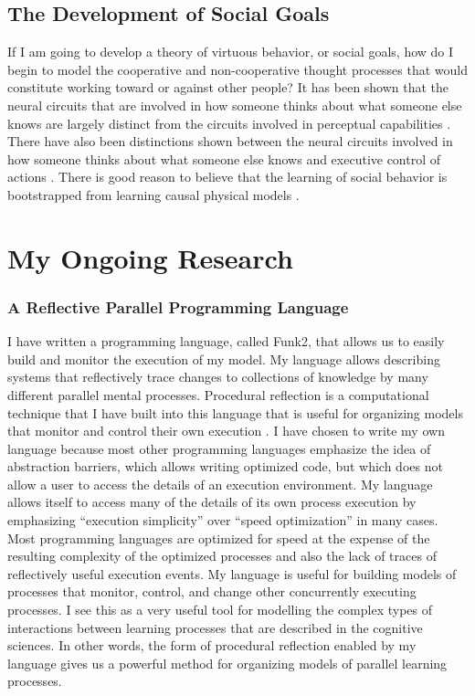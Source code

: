 \subsection{The Development of Social Goals}

If I am going to develop a theory of virtuous behavior, or social
goals, how do I begin to model the cooperative and non-cooperative
thought processes that would constitute working toward or against
other people? It has been shown that the neural circuits that are
involved in how someone thinks about what someone else knows are
largely distinct from the circuits involved in perceptual capabilities
\citep{bedny:2009}. There have also been distinctions shown between
the neural circuits involved in how someone thinks about what someone
else knows and executive control of actions \citep{saxe:2006}. There
is good reason to believe that the learning of social behavior is
bootstrapped from learning causal physical models \citep{perner:1991}.

\section{My Ongoing Research}

\subsubsection{A Reflective Parallel Programming Language}

I have written a programming language, called Funk2,
\citep{morgan:2009} that allows us to easily build and monitor the
execution of my model. My language allows describing systems that
reflectively trace changes to collections of knowledge by many
different parallel mental processes. Procedural reflection is a
computational technique that I have built into this language that is
useful for organizing models that monitor and control their own
execution \citep{maes:1987}. I have chosen to write my own language
because most other programming languages emphasize the idea of
abstraction barriers, which allows writing optimized code, but which
does not allow a user to access the details of an execution
environment. My language allows itself to access many of the details
of its own process execution by emphasizing ``execution simplicity''
over ``speed optimization'' in many cases. Most programming languages
are optimized for speed at the expense of the resulting complexity of
the optimized processes and also the lack of traces of reflectively
useful execution events. My language is useful for building models of
processes that monitor, control, and change other concurrently
executing processes. I see this as a very useful tool for modelling
the complex types of interactions between learning processes that are
described in the cognitive sciences. In other words, the form of
procedural reflection enabled by my language gives us a powerful
method for organizing models of parallel learning processes.

